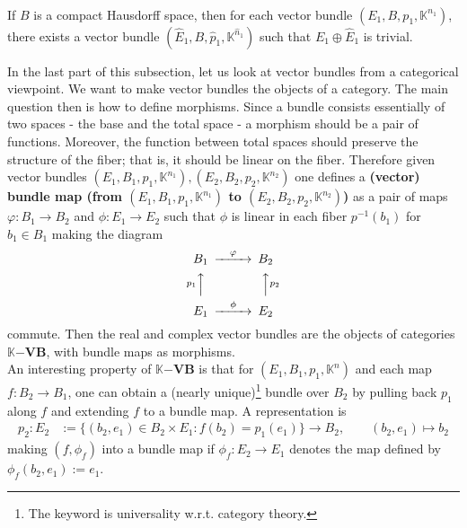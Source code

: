 \\
\begin{prp}
\label{prp:vbtriv}
If $B$ is a compact Hausdorff space, then for each vector bundle $(E_{1},B,p_{1},\mathbb{K}^{n_{1}})$, there exists a vector bundle $(\hat{E}_{1},B,\hat{p}_{1},\mathbb{K}^{\hat{n}_{1}})$ such that $E_{1} \oplus \hat{E}_{1}$ is trivial.
\end{prp}
In the last part of this subsection, let us look at vector bundles from a categorical viewpoint.
We want to make vector bundles the objects of a category.
The main question then is how to define morphisms.
Since a bundle consists essentially of two spaces - the base and the total space - a morphism should be a pair of functions.
Moreover, the function between total spaces should preserve the structure of the fiber; that is, it should be linear on the fiber.
Therefore given vector bundles $(E_{1},B_{1},p_{1},\mathbb{K}^{n_{1}}),(E_{2},B_{2},p_{2},\mathbb{K}^{n_{2}})$ one defines a \textbf{(vector) bundle map (from $(E_{1},B_{1},p_{1},\mathbb{K}^{n_{1}})$ to $(E_{2},B_{2},p_{2},\mathbb{K}^{n_{2}})$)} as a pair of maps $\varphi \colon B_{1} \to B_{2}$ and $\phi \colon E_{1} \to E_{2}$ such that $\phi$ is linear in each fiber $p^{-1}(b_{1})$ for $b_{1} \in B_{1}$ making the diagram
\begin{align*}
\begin{CD}
  B_{1}
  @>\varphi>>
  B_{2}
  \\
  @Ap_{1}AA
  @AAp_{2}A
  \\
  E_{1}
  @>\phi>>
  E_{2}
\end{CD}
\end{align*}
commute.
Then the real and complex vector bundles are the objects of categories $\mathbb{K}\mathbf{-VB}$, with bundle maps as morphisms.
\\
An interesting property of $\mathbb{K}\mathbf{-VB}$ is that for $(E_{1},B_{1},p_{1},\mathbb{K}^{n})$ and each map $f \colon B_{2} \to B_{1}$, one can obtain a (nearly unique)\footnote{The keyword is universality w.r.t. category theory.} bundle over $B_{2}$ by {\glqq}pulling back{\grqq} $p_{1}$ along $f$ and extending $f$ to a bundle map.
A representation is
\begin{align*}
  p_{2}
  \colon
  E_{2}
  &:=
  \lbrace
      (b_{2},e_{1})
      \in
      B_{2}
      \times
      E_{1}
    \colon
      f(b_{2})
      =
      p_{1}(e_{1})
  \rbrace
  \to
  B_{2}
  ,\qquad
  (b_{2},e_{1})
  \mapsto
  b_{2}
\end{align*}
making $(f,\phi_{f})$ into a bundle map if $\phi_{f} \colon E_{2} \to E_{1}$ denotes the map defined by $\phi_{f}(b_{2},e_{1}) := e_{1}$.
